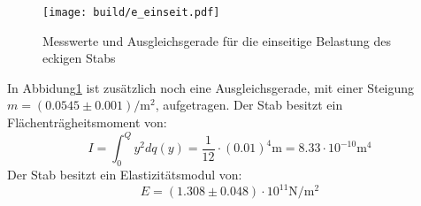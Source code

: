 \begin{figure}[H]
    \centering
    \texttt{[image: build/e\_einseit.pdf]}
    \caption{Messwerte und Ausgleichsgerade für die einseitige Belastung des eckigen Stabs}
    \label{fig:plot2}
\end{figure}
In Abbidung\ref{fig:plot2} ist zusätzlich noch eine Ausgleichsgerade, mit einer Steigung $m=(0.0545\pm0.001)\si{\per\meter\squared}$, aufgetragen.
Der Stab besitzt ein Flächenträgheitsmoment von:
\begin{equation*}
  I=\int_0^Q y^2 dq(y) = \frac{1}{12}\cdot (0.01)^4\si{\meter} = 8.33\cdot 10^{-10}\si{\meter}^4
\end{equation*}
Der Stab besitzt ein Elastizitätsmodul von:
\begin{equation*}
  E= (1.308\pm 0.048)\cdot10^{11} \si{\newton\per\meter\squared}
\end{equation*}
